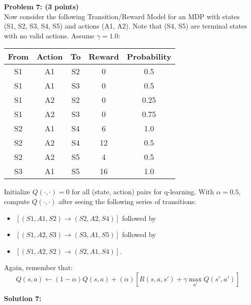 \documentclass[]{article}
\begin{document}
\clearpage
\textbf{Problem 7: (3 points)}\\
Now consider the following Transition/Reward Model for an MDP with states (S1, S2, S3, S4, S5) and actions (A1, A2). Note that (S4, S5) are terminal states with no valid actions. Assume $\gamma=1.0$:
\begin{table}[htb]
\centering
    \begin{tabular}{|c|c|c|c|c|}
      \hline
        From &  Action &    To &    Reward &    Probability \\\hline
        S1 &    A1 &    S2 &    0 & 0.5 \\\hline
        S1 &    A1 &    S3 &    0 & 0.5 \\\hline
        S1 &    A2 &    S2 &    0 & 0.25 \\\hline
        S1 &    A2 &    S3 &    0 & 0.75 \\\hline
        S2 &    A1 &    S4 &    6 & 1.0 \\\hline
        S2 &    A2 &    S4 &    12 &    0.5 \\\hline
        S2 &    A2 &    S5 &    4 & 0.5 \\\hline
        S3 &    A1 &    S5 &    16 &    1.0 \\\hline
    \end{tabular}
\end{table}
Initialize $Q(\cdot,\cdot) = 0$ for all (state, action) pairs for q-learning. With $\alpha = 0.5$, compute $Q(\cdot,\cdot)$ after seeing the following series of transitions:
\begin{itemize}
    \item $[(S1,A1,S2) \rightarrow (S2,A2,S4)]$ followed by
    \item $[(S1,A2,S3) \rightarrow (S3,A1,S5)]$ followed by
    \item $[(S1,A2,S2) \rightarrow (S2,A1,S4)]$.
\end{itemize}
Again, remember that: $$Q(s,a) \leftarrow (1-\alpha)Q(s,a) + (\alpha)[R(s,a,s') + \gamma \max_{a'}Q(s',a')]$$

\bigskip

\textbf{Solution 7:}
\end{document}
